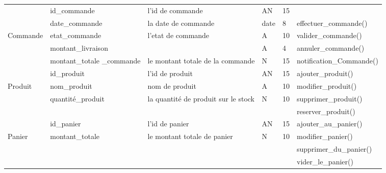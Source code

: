\documentclass[edit,12pt,a4paper,ChapStyle,oneside,doubleinterligne]{report}
\begin{document}
\begin{table}[H]
    \centering
    \begin{tabular}{ | m{} | m{}| m{3cm} |m{}|m{}|l|}
    \hline
                                          &id\_commande&l'id de commande&AN&15& \\\cline{2-5}
                                          &date\_commande&la date de commande&date&8&effectuer\_commande() \\\cline{2-5}
                                Commande  &etat\_commande&l'etat de commande&A&10&valider\_commande() \\\cline{2-5}
                                          &montant\_livraison&            &A&4&annuler\_commande()\\\cline{2-5}
                                          &montant\_totale \_commande&le montant totale de la commande&N&15&notification\_Commande() \\\hline


                                          &id\_produit&l'id de produit&AN&15&ajouter\_produit() \\\cline{2-5}
                                Produit   &nom\_produit&nom de produit&A&10&modifier\_produit() \\\cline{2-5}
                                          &quantité\_produit&la quantité de produit sur le stock&N&10&supprimer\_produit()\\\cline{2-5}
                                          &                 &                                   & &  &reserver\_produit() \\\hline

                                          &id\_panier&l'id de panier&AN&15&ajouter\_au\_panier() \\\cline{2-5}
                                Panier    &montant\_totale&le montant totale de panier&N&10&modifier\_panier() \\\cline{2-5}
                                          &                 &                         & &  &supprimer\_du\_panier()\\\cline{2-5}
                                          &                 &                         & &  &vider\_le\_panier()\\\hline



\end{tabular}
\end{table}
\end{document}
